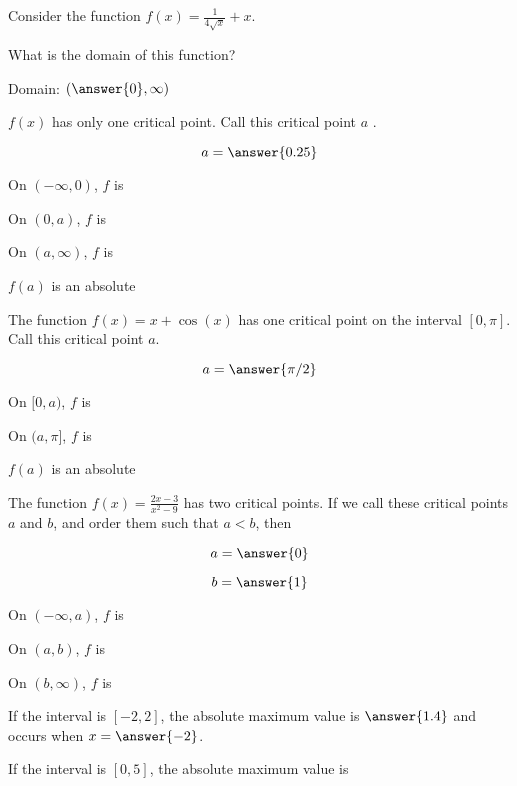\documentclass[handout]{ximera}
\begin{document}
\begin{exercise}
Consider the function $f(x) =\displaystyle\frac{1}{4\sqrt{x}}+x$.

What is the domain of this function? 

Domain: $ (\answer{0}, \infty)$

$f(x)$ has only one critical point.  Call this critical point $a$ .

$$
a = \answer{0.25}
$$

On $(-\infty,0)$, $f$ is 

On $(0,a)$, $f$ is 

On $(a,\infty)$, $f$ is 

$f(a)$ is an absolute 

\end{exercise}

\begin{exercise}
The function $f(x) =x+\cos(x)$ has one critical point on the interval $[0,\pi]$. Call this critical point $a$.

$$
a = \answer{\pi/2}
$$

On $[0,a)$, $f$ is 

On $(a,\pi]$, $f$ is 

$f(a)$ is an absolute 

\end{exercise}


\begin{exercise}
The function $f(x)=\displaystyle{\frac{2x-3}{x^2-9}}$ has two critical points.  If we
call these critical points $a$ and $b$, and order them such that $a <
b $, then

$$
a = \answer{0}
$$

$$
b=\answer{1}
$$

On $(-\infty,a)$, $f$ is 

On $(a,b)$, $f$ is 

On $(b,\infty)$, $f$ is 

If the interval is $[-2,2]$, the absolute maximum value is $\answer{1.4}$ and occurs when $x = \answer{-2}$.

\vspace{.25in}

If the interval is $[0,5]$, the absolute maximum value is 


\end{exercise}
\end{document}
